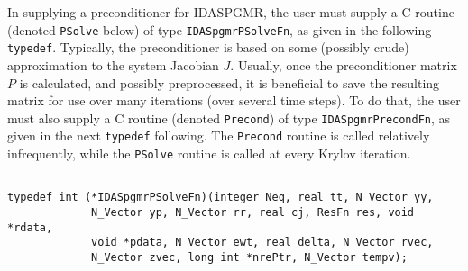 In supplying a preconditioner for IDASPGMR, the user must supply a C
routine (denoted {\tt PSolve} below) of type {\tt IDASpgmrPSolveFn},
as given in the following {\tt typedef}.  Typically, the
preconditioner is based on some (possibly crude) approximation to the
system Jacobian $J$.  Usually, once the preconditioner matrix $P$ is
calculated, and possibly preprocessed, it is beneficial to save the
resulting matrix for use over many iterations (over several time
steps).  To do that, the user must also supply a C routine (denoted
{\tt Precond}) of type {\tt IDASpgmrPrecondFn}, as given in the next
{\tt typedef} following.  The {\tt Precond} routine is called
relatively infrequently, while the {\tt PSolve} routine is called
at every Krylov iteration.

\small
\begin{verbatim}

typedef int (*IDASpgmrPSolveFn)(integer Neq, real tt, N_Vector yy,
             N_Vector yp, N_Vector rr, real cj, ResFn res, void *rdata,
             void *pdata, N_Vector ewt, real delta, N_Vector rvec,
             N_Vector zvec, long int *nrePtr, N_Vector tempv);


\end{verbatim}

